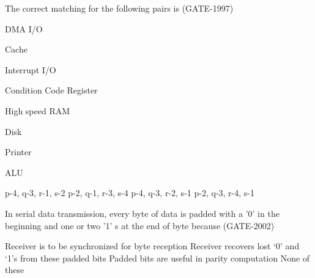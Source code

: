 \begin{questyle}
  \question  The correct matching for the following pairs is  (GATE-1997)
             \begin{multicols}{2}
                \item[P.] DMA I/O
                \item[Q.] Cache
                \item[R.] Interrupt I/O
                \item[S.] Condition Code Register
                \item[1.] High speed RAM
                \item[2.] Disk
                \item[3.] Printer
                \item[4.] ALU
             \end{multicols}
  \begin{oneparchoices}
    \choice         p-4, q-3, r-1, s-2
    \CorrectChoice  p-2, q-1, r-3, s-4
    \choice         p-4, q-3, r-2, s-1
    \choice         p-2, q-3, r-4, s-1
  \end{oneparchoices}
\end{questyle}

\begin{questyle}
  \question  In serial data transmission, every byte of data is padded with a '0' in the beginning and
             one or two '1' s at the end of byte because  (GATE-2002)

  \begin{choices}
    \CorrectChoice  Receiver is to be synchronized for byte reception
    \choice         Receiver recovers lost ‘0’ and ‘1’s from these padded bits
    \choice         Padded bits are useful in parity computation
    \choice         None of these
  \end{choices}
\end{questyle}

